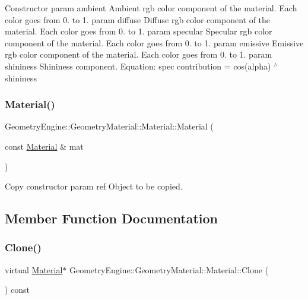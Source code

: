Constructor param ambient Ambient rgb color component of the material. Each color goes from 0. to 1. param diffuse Diffuse rgb color component of the material. Each color goes from 0. to 1. param specular Specular rgb color component of the material. Each color goes from 0. to 1. param emissive Emissive rgb color component of the material. Each color goes from 0. to 1. param shininess Shininess component. Equation\+: spec contribution = cos(alpha) $^\wedge$ shininess \mbox{\label{class_geometry_engine_1_1_geometry_material_1_1_material_a18c3bbd40d6c410c9c8ca9dfc36f15ee}} 
\subsubsection{\texorpdfstring{Material()}{Material()}\hspace{0.1cm}{\footnotesize\ttfamily [2/2]}}
{\footnotesize\ttfamily Geometry\+Engine\+::\+Geometry\+Material\+::\+Material\+::\+Material (\begin{DoxyParamCaption}\item[{const \mbox{\hyperlink{class_geometry_engine_1_1_geometry_material_1_1_material}{Material}} \&}]{mat }\end{DoxyParamCaption})}

Copy constructor param ref Object to be copied. 

\subsection{Member Function Documentation}
\mbox{\label{class_geometry_engine_1_1_geometry_material_1_1_material_ae5513ff06d536365e18ddc5e07e79784}} 
\subsubsection{\texorpdfstring{Clone()}{Clone()}}
{\footnotesize\ttfamily virtual \mbox{\hyperlink{class_geometry_engine_1_1_geometry_material_1_1_material}{Material}}$\ast$ Geometry\+Engine\+::\+Geometry\+Material\+::\+Material\+::\+Clone (\begin{DoxyParamCaption}{ }\end{DoxyParamCaption}) const\hspace{0.3cm}{\ttfamily [pure virtual]}}

